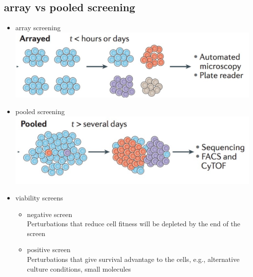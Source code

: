 \documentclass[font=12pt]{article}
\begin{document}
\subsection{array vs pooled screening}
\begin{itemize}
	\item array screening\includegraphics[width=0.7\linewidth]{arrayscreening}
	
	\item pooled screening\includegraphics[width=0.7\linewidth]{pooledscreening}
	\item viability screens
	\begin{itemize}
		\item negative screen\\
		Perturbations that reduce cell fitness will be depleted by the end of the screen
		\item positive screen\\
		Perturbations that give survival advantage to the cells, e.g., alternative culture conditions, small molecules
	\end{itemize}
\end{itemize}
\end{document}
